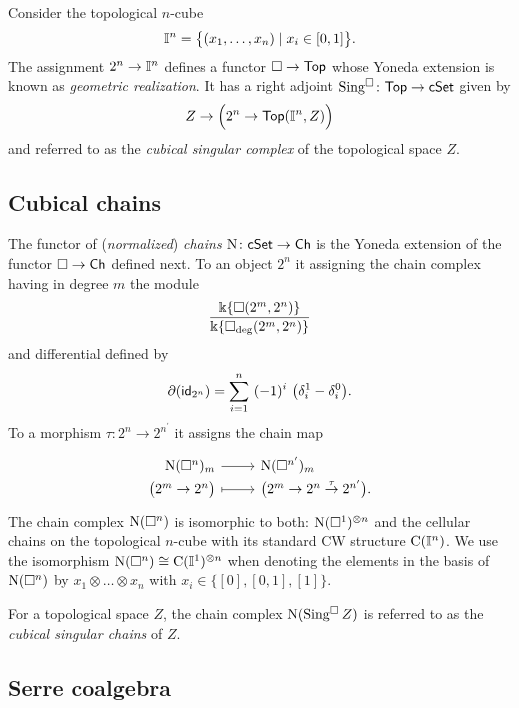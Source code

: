 Consider the topological $n$-cube
\begin{equation} \label{e:topological cube}
\mathbb{I}^{n} = \big\{ (x_1, \dots, x_n) \mid x_i \in [0,1] \big\}.
\end{equation}
The assignment $2^n \to \mathbb{I}^n$ defines a functor $\square \to \mathsf{Top}$ whose Yoneda extension is known as \textit{geometric realization}.
It has a right adjoint $\operatorname{Sing^{\square}} \colon \mathsf{Top} \to \mathsf{cSet}$ given by
\[
Z \to \Big(2^n \to \mathsf{Top}(\mathbb{I}^n, Z)\Big)
\]
and referred to as the \textit{cubical singular complex} of the topological space $Z$.

\subsection{Cubical chains}

The functor of (\textit{normalized}) \textit{chains} $\operatorname{N} \colon \mathsf{cSet} \to \mathsf{Ch}$ is the Yoneda extension of the functor $\square \to \mathsf{Ch}$ defined next.
To an object $2^n$ it assigning the chain complex having in degree $m$ the module
\[
\frac{\Bbbk\{\square(2^m, 2^n)\}}{\Bbbk\{\square_{\deg}(2^m, 2^n)\}}
\]
and differential defined by
\[
\partial (\id_{2^n}) = \sum_{i=1}^{n} \ (-1)^i \
\big(\delta_i^1 - \delta_i^0 \big).
\]
To a morphism $\tau \colon 2^n \to 2^{n^\prime}$ it assigns the chain map
\[
\begin{tikzcd}[row sep=-3pt, column sep=normal,
/tikz/column 1/.append style={anchor=base east},
/tikz/column 2/.append style={anchor=base west}]
\chains(\cube^n)_m \arrow[r] & \chains(\cube^{n^\prime})_m \\
\big( 2^m \to 2^n \big) \arrow[r, mapsto] & \big( 2^m \to 2^n \stackrel{\tau}{\to} 2^{n^\prime} \big).
\end{tikzcd}
\]
The chain complex $\operatorname{N}(\square^n)$ is isomorphic to both: $\operatorname{N}(\square^1)^{\otimes n}$ and the cellular chains on the topological $n$-cube with its standard CW structure $\operatorname{C}(\mathbb{I}^n)$.
We use the isomorphism $\operatorname{N}(\square^n) \cong \operatorname{C}(\mathbb{I}^1)^{\otimes n}$ when denoting the elements in the basis of $\operatorname{N}(\square^n)$ by $x_1 \otimes \dots \otimes x_n$ with $x_i \in \{[0], [0,1], [1]\}$.

For a topological space $Z$, the chain complex $\operatorname{N}(\operatorname{Sing^{\square}} Z)$ is referred to as the \textit{cubical singular chains} of $Z$.

\subsection{Serre coalgebra} \label{ss:serre coalgebra}

